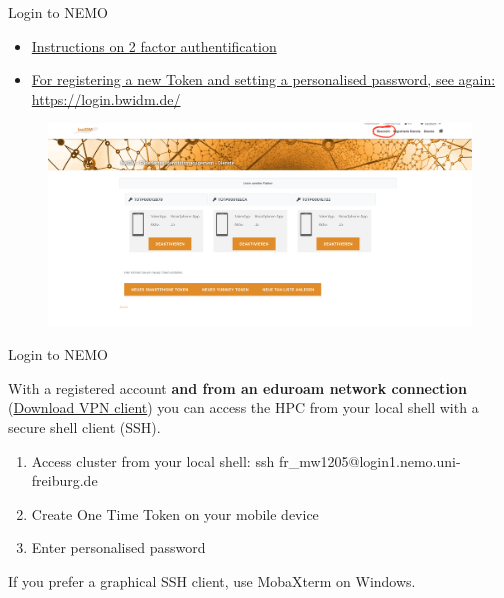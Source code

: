 \documentclass{beamer}
\begin{document}
\begin{frame}{Login to NEMO}

\begin{itemize}

\item \href{https://wiki.bwhpc.de/e/Registration/2FA}{Instructions on 2 factor authentification} 

\item \href{https://login.bwidm.de/}{For registering a new Token and setting a personalised password, see again: https://login.bwidm.de/}

\end{itemize}

\begin{figure}
    \centering
    \includegraphics[width=0.95\linewidth]{figures/BWIDM.png}
\end{figure}

\end{frame}

\begin{frame}{Login to NEMO}

With a registered account \textbf{and from an eduroam network connection} (\href{https://www.rz.uni-freiburg.de/en/services/netztel-en/vpn-1?set_language=en}{Download VPN client}) you can access the HPC from your local shell with a secure shell client (SSH).

\begin{enumerate}
    \item Access cluster from your local shell: ssh fr\_mw1205@login1.nemo.uni-freiburg.de
    \item Create One Time Token on your mobile device
    \item Enter personalised password
\end{enumerate}
\vspace{0.6cm}
\scalebox{0.6}{

}
\vspace{0.4cm}

If you prefer a graphical SSH client, use MobaXterm on Windows.

\end{frame}
\end{document}
